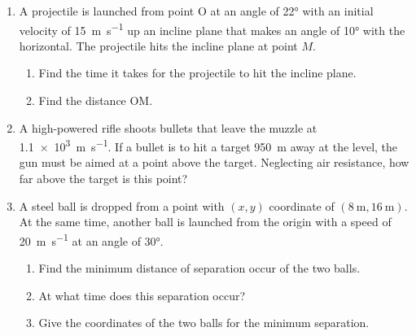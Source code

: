 \documentclass{../../../oss-classkick}
\begin{document}
\begin{enumerate}[leftmargin=15pt]
\begin{center}

  \end{center}
  \newpage

\item A projectile is launched from point O at an angle of \ang{22} with an
  initial velocity of \SI{15}{\metre\per\second} up an incline plane that makes
  an angle of \ang{10} with the horizontal. The projectile hits the incline
  plane at point $M$.
  \begin{center}
  \end{center}
  \begin{enumerate}[nosep]
  \item Find the time it takes for the projectile to hit the incline plane.
  \item Find the distance OM.
  \end{enumerate}
  \vspace{4in}
  
\item A high-powered rifle shoots bullets that leave the muzzle at
  \SI{1.1e3}{\metre\per\second}. If a bullet is to hit a target
  \SI{950}{\metre} away at the level, the gun must be aimed at a point above
  the target. Neglecting air resistance, how far above the target is this
  point? 
  \newpage
  
\item A steel ball is dropped from a point with $(x,y)$ coordinate of
  $(\SI{8}{\metre},\SI{16}{\metre})$. At the same time, another ball is launched
  from the origin with a speed of \SI{20}{\metre\per\second} at an angle of
  \ang{30}.
  \begin{enumerate}[nosep,leftmargin=15pt]
  \item Find the minimum distance of separation occur of the two balls.
  \item At what time does this separation occur?
  \item Give the coordinates of the two balls for the minimum separation.
  \end{enumerate}
  \newpage


\end{enumerate}
\end{document}
